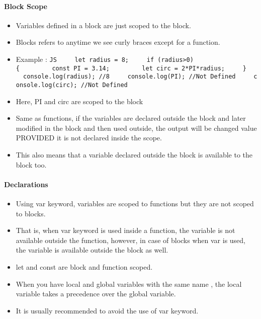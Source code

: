 \documentclass[
  paper=a4,
  ,captions=tableheading
]{scrartcl}
\providecommand{\tightlist}{%
  \setlength{\itemsep}{0pt}\setlength{\parskip}{0pt}}
\begin{document}
\hypertarget{block-scope}{%
\paragraph{Block Scope}\label{block-scope}}

\begin{itemize}
\tightlist
\item
  Variables defined in a block are just scoped to the block.
\item
  Blocks refers to anytime we see curly braces except for a function.
\item
  Example :
  \texttt{JS\ \ \ \ \ let\ radius\ =\ 8;\ \ \ \ \ if\ (radius\textgreater{}0)\{\ \ \ \ \ \ \ \ \ const\ PI\ =\ 3.14;\ \ \ \ \ \ \ \ \ let\ circ\ =\ 2*PI*radius;\ \ \ \ \ \}\ \ \ \ \ console.log(radius);\ //8\ \ \ \ \ console.log(PI);\ //Not\ Defined\ \ \ \ \ console.log(circ);\ //Not\ Defined}
\item
  Here, PI and circ are scoped to the block
\item
  Same as functions, if the variables are declared outside the block and
  later modified in the block and then used outside, the output will be
  changed value PROVIDED it is not declared inside the scope.
\item
  This also means that a variable declared outside the block is
  available to the block too.
\end{itemize}

\hypertarget{declarations}{%
\paragraph{Declarations}\label{declarations}}

\begin{itemize}
\tightlist
\item
  Using var keyword, variables are scoped to functions but they are not
  scoped to blocks.
\item
  That is, when var keyword is used inside a function, the variable is
  not available outside the function, however, in case of blocks when
  var is used, the variable is available outside the block as well.
\item
  let and const are block and function scoped.
\item
  When you have local and global variables with the same name , the
  local variable takes a precedence over the global variable.
\item
  It is usually recommended to avoid the use of var keyword.
\end{itemize}
\end{document}
